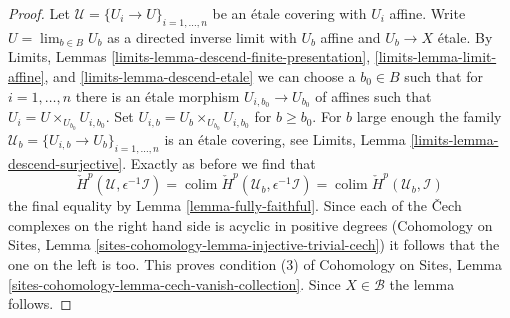 \documentclass[10pt,a4paper]{amsart}
\theoremstyle{plain}
\theoremstyle{definition}
\theoremstyle{remark}
\numberwithin{equation}{subsection}
\def\lim{\mathop{\mathrm{lim}}\nolimits}
\def\colim{\mathop{\mathrm{colim}}\nolimits}
\begin{document}
\begin{proof}
\medskip\noindent
Let $\mathcal{U} = \{U_i \to U\}_{i = 1, \ldots, n}$ be an \'etale covering
with $U_i$ affine. Write $U = \lim_{b \in B} U_b$ as a directed inverse limit
with $U_b$ affine and $U_b \to X$ \'etale.
By Limits, Lemmas \ref{limits-lemma-descend-finite-presentation},
\ref{limits-lemma-limit-affine}, and
\ref{limits-lemma-descend-etale}
we can choose a $b_0 \in B$ such that for $i = 1, \ldots, n$ there is an
\'etale morphism $U_{i, b_0} \to U_{b_0}$ of affines
such that $U_i = U \times_{U_{b_0}} U_{i, b_0}$.
Set $U_{i, b} = U_b \times_{U_{b_0}} U_{i, b_0}$ for $b \geq b_0$.
For $b$ large enough the family
$\mathcal{U}_b = \{U_{i, b} \to U_b\}_{i = 1, \ldots, n}$
is an \'etale covering, see
Limits, Lemma \ref{limits-lemma-descend-surjective}.
Exactly as before we find that
$$
\check{H}^p(\mathcal{U}, \epsilon^{-1}\mathcal{I}) =
\colim \check{H}^p(\mathcal{U}_b, \epsilon^{-1}\mathcal{I}) =
\colim \check{H}^p(\mathcal{U}_b, \mathcal{I})
$$
the final equality by Lemma \ref{lemma-fully-faithful}.
Since each of the {\v C}ech complexes on the right hand side is
acyclic in positive degrees
(Cohomology on Sites, Lemma
\ref{sites-cohomology-lemma-injective-trivial-cech})
it follows that the one on the left is too. This proves condition (3) of
Cohomology on Sites, Lemma \ref{sites-cohomology-lemma-cech-vanish-collection}.
Since $X \in \mathcal{B}$ the lemma follows.
\end{proof}
\end{document}
